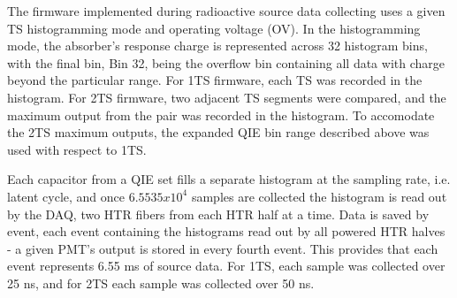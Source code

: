 The firmware implemented during radioactive source data collecting uses a
given TS histogramming mode and operating voltage (OV). In the histogramming
mode, the absorber's response charge is represented across 32 histogram bins,
with the final bin, Bin 32, being the overflow bin containing all data with
charge beyond the particular range. For 1TS firmware, each TS was recorded in
the histogram. For 2TS firmware, two adjacent TS segments were compared, and
the maximum output from the pair was recorded in the histogram. To accomodate
the 2TS maximum outputs, the expanded QIE bin range described above was used
with respect to 1TS.

Each capacitor from a QIE set fills a separate histogram at the sampling rate,
i.e. latent cycle, and once $6.5535 x 10^4$ samples are collected the histogram
is read out by the DAQ, two HTR fibers from each HTR half at a time. Data is
saved by event, each event containing the histograms read out by all powered HTR
halves - a given PMT's output is stored in every fourth event. This provides
that each event represents 6.55 ms of source data. For 1TS, each sample
was collected over 25 ns, and for 2TS each sample was collected over
50 ns.